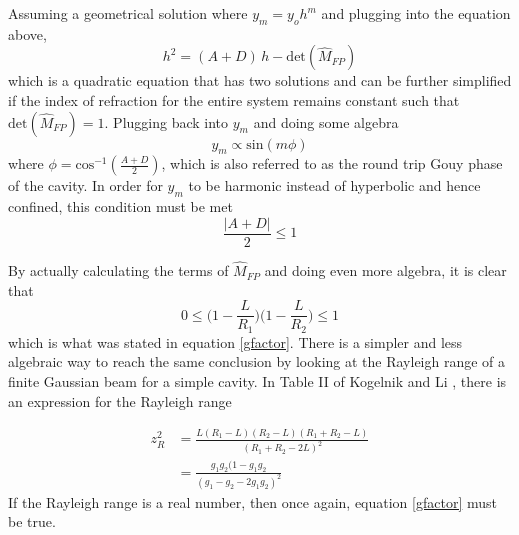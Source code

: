 \begin{appendices}
	Assuming a geometrical solution where $y_m = y_o h^m$ and plugging into the equation above, 
	\begin{equation}
	h^2 = (A+D) \, h - \text{det}(\hat{M}_{FP})
	\end{equation}
	which is a quadratic equation that has two solutions and can be further simplified if the index of refraction for the entire system remains constant such that $\text{det}(\hat{M}_{FP}) =1 $.  Plugging back into $y_m$ and doing some algebra
	\begin{equation}
	y_m \propto \text{sin}(m \phi )
	\end{equation}
	where $\phi =\text{cos}^{-1} (\frac{A+D}{2})$, which is also referred to as the round trip Gouy phase of the cavity.  In order for $y_m$ to be harmonic instead of hyperbolic and hence confined, this condition must be met
	\begin{equation}
	\frac{\vert A+D \vert}{2} \leq 1
	\end{equation}
	
	By actually calculating the terms of $\hat{M}_{FP}$ and doing even more algebra, it is clear that 
	\begin{equation}
	0 \leq \bigg(1-\frac{L}{R_1}\bigg) \bigg(1-\frac{L}{R_2}\bigg) \leq 1
	\end{equation}
	which is what was stated in equation \ref{gfactor}. There is a simpler and less algebraic way to reach the same conclusion by looking at the Rayleigh range of a finite Gaussian beam for a simple cavity.   In Table II of Kogelnik and Li \cite{Kogelnik}, there is an expression for the Rayleigh range
	
	\begin{equation}
	\begin{aligned}
	z_{R}^2 &= \frac{L (R_1-L) (R_2-L) (R_1+R_2 - L) }  {(R_1+R_2-2L)^2}\\
			&= \frac{g_1 g_2 (1-g_1 g_2}{(g_1 - g_2 - 2 g_1 g_2)^2}
	\end{aligned}
	\end{equation}
	If the Rayleigh range is a real number, then once again, equation \ref{gfactor} must be true.
	

\end{appendices}
